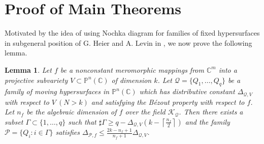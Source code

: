 \documentclass[12pt,leqno]{amsart}
\newtheorem{lemma}[equation]{Lemma}
\newcommand{\C}{{\mathbb{C}}}
\renewcommand{\P}{{\mathbb{P}}}
\numberwithin{equation}{section}
\begin{document}
\section{Proof of Main Theorems}
Motivated by the idea of using Nochka diagram for families of fixed hypersurfaces in subgeneral position of G. Heier and A. Levin in \cite{HL}, we now prove the following lemma.

\begin{lemma}\label{4.1}
Let $f$ be a nonconstant meromorphic mappings from $\C^m$ into a projective subvariety $V\subset\P^n(\C)$ of dimension $k$. Let $\mathcal{Q} = \{Q_1, \ldots, Q_q\}$ be a family of moving hypersurfaces in $\P^n(\C)$ which has distributive constant $\Delta_{\mathcal Q,V}$ with respect to $V\ (N> k)$ and satisfying the B\'ezout property with respect to $f$. Let $n_f$ be the algebraic dimension of $f$ over the field $\mathcal K_{\mathcal Q}$. Then there exists a subset $\Gamma \subset \{1,\ldots,q\}$ such that $\sharp\Gamma\ge q -\Delta_{\mathcal Q,V}\left(k-\left\lceil\frac{n_f}{2}\right\rceil\right)$ and the family $\mathcal P= \{Q_i : i \in \Gamma\}$ satisfies $\Delta_{\mathcal P,f}\le \frac{2k-n_f+1}{n_f+1}\Delta_{\mathcal Q,V}$.
\end{lemma}
\end{document}
